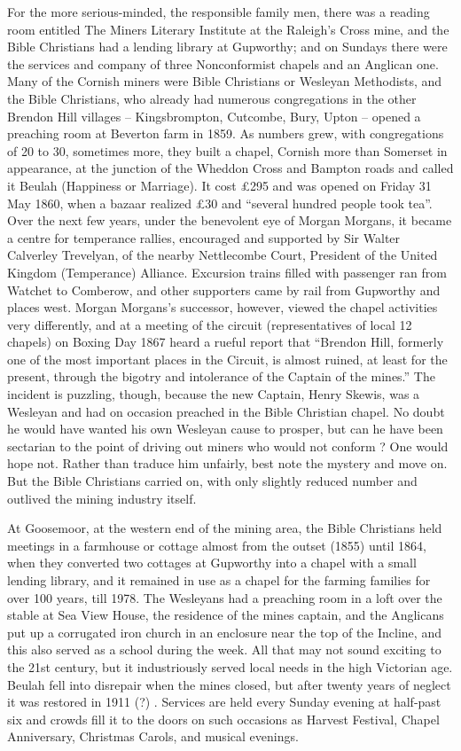\documentclass[11pt]{book}
\begin{document}
For the more serious-minded, the responsible family men, there was a reading room entitled The Miners Literary Institute at the Raleigh’s Cross mine, and the Bible Christians had a lending library at Gupworthy;  and on Sundays there were  the services and company of  three Nonconformist chapels and an Anglican one. Many of the Cornish miners were Bible Christians or Wesleyan Methodists, and the Bible Christians, who already had numerous congregations in the other Brendon Hill villages – Kingsbrompton, Cutcombe, Bury, Upton – opened a preaching room at Beverton farm in 1859. As numbers grew, with congregations of 20 to 30, sometimes more, they built a chapel, Cornish more than Somerset in appearance, at the junction of the Wheddon Cross and Bampton roads and called it Beulah (Happiness or Marriage). It cost £295 and was opened on Friday 31 May 1860, when a bazaar realized £30 and “several hundred people took tea”.  Over the next few years, under the benevolent eye of Morgan Morgans,  it became a centre for temperance rallies, encouraged and supported by Sir Walter Calverley Trevelyan, of the nearby Nettlecombe Court, President of the United Kingdom (Temperance) Alliance. Excursion trains filled with passenger ran from Watchet to Comberow, and other supporters came by rail from Gupworthy and places west. Morgan Morgans’s successor, however, viewed the chapel activities very differently, and at a meeting of the circuit (representatives of local 12 chapels) on Boxing Day 1867 heard a rueful report that “Brendon Hill, formerly one of the most important places in the Circuit, is almost ruined, at least for the present, through the bigotry and intolerance of the Captain of the mines.” The incident is puzzling, though, because the new Captain, Henry Skewis, was a Wesleyan and had on occasion preached in the Bible Christian chapel.   No doubt he would have wanted his own Wesleyan cause to prosper,  but can he have been sectarian to the point of  driving out miners who would not conform ?  One would hope not. Rather than traduce him unfairly, best note the mystery and move on.  But the Bible Christians carried on, with only slightly reduced number and outlived the mining industry itself.

At Goosemoor, at the western end of the mining area, the Bible Christians held meetings in  a farmhouse  or cottage almost from the outset (1855) until 1864, when they converted two cottages at Gupworthy into a chapel with a small lending library, and it remained in use as a chapel for the farming families for over 100 years, till 1978. The Wesleyans had a preaching room in a loft over the stable at Sea View House, the residence of the mines captain, and the Anglicans put up a corrugated iron church in an enclosure near the top of the Incline, and this also served as a school during the week. All that may not sound exciting to the 21st century, but it industriously served local  needs in the high Victorian age. Beulah fell into disrepair when the mines closed, but after twenty years of neglect it was restored in 1911 (?) . Services are held every Sunday evening at half-past six  and crowds fill it to the doors on such occasions as Harvest Festival, Chapel Anniversary, Christmas Carols, and musical evenings.
\end{document}
